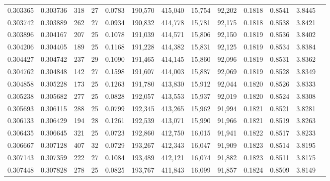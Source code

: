 \begin{tabular}{rrrrrrrrrrrrr}
0.303365 & 0.303736 &    318 &    27 &                                     0.0783 & 190,570 & 415,040 &  15,754 &  92,202 & 0.1818 & 0.8541 & 3.8445 \\
0.303742 & 0.303889 &    262 &    27 &                                     0.0934 & 190,832 & 414,778 &  15,781 &  92,175 & 0.1818 & 0.8538 & 3.8421 \\
0.303896 & 0.304167 &    207 &    25 &                                     0.1078 & 191,039 & 414,571 &  15,806 &  92,150 & 0.1819 & 0.8536 & 3.8402 \\
0.304206 & 0.304405 &    189 &    25 &                                     0.1168 & 191,228 & 414,382 &  15,831 &  92,125 & 0.1819 & 0.8534 & 3.8384 \\
0.304427 & 0.304742 &    237 &    29 &                                     0.1090 & 191,465 & 414,145 &  15,860 &  92,096 & 0.1819 & 0.8531 & 3.8362 \\
0.304762 & 0.304848 &    142 &    27 &                                     0.1598 & 191,607 & 414,003 &  15,887 &  92,069 & 0.1819 & 0.8528 & 3.8349 \\
0.304858 & 0.305228 &    173 &    25 &                                     0.1263 & 191,780 & 413,830 &  15,912 &  92,044 & 0.1820 & 0.8526 & 3.8333 \\
0.305238 & 0.305682 &    277 &    25 &                                     0.0828 & 192,057 & 413,553 &  15,937 &  92,019 & 0.1820 & 0.8524 & 3.8308 \\
0.305693 & 0.306115 &    288 &    25 &                                     0.0799 & 192,345 & 413,265 &  15,962 &  91,994 & 0.1821 & 0.8521 & 3.8281 \\
0.306133 & 0.306429 &    194 &    28 &                                     0.1261 & 192,539 & 413,071 &  15,990 &  91,966 & 0.1821 & 0.8519 & 3.8263 \\
0.306435 & 0.306645 &    321 &    25 &                                     0.0723 & 192,860 & 412,750 &  16,015 &  91,941 & 0.1822 & 0.8517 & 3.8233 \\
0.306667 & 0.307128 &    407 &    32 &                                     0.0729 & 193,267 & 412,343 &  16,047 &  91,909 & 0.1823 & 0.8514 & 3.8195 \\
0.307143 & 0.307359 &    222 &    27 &                                     0.1084 & 193,489 & 412,121 &  16,074 &  91,882 & 0.1823 & 0.8511 & 3.8175 \\
0.307448 & 0.307828 &    278 &    25 &                                     0.0825 & 193,767 & 411,843 &  16,099 &  91,857 & 0.1824 & 0.8509 & 3.8149 \\

\end{tabular}
